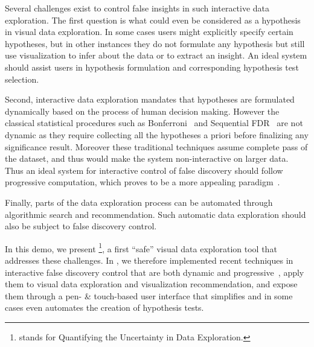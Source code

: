 Several challenges exist to control false insights in such interactive data exploration.  
The first question is what could even be considered as a hypothesis in visual data exploration.
In some cases users might explicitly specify certain hypotheses, but in other instances they do not formulate any hypothesis but still use visualization to infer about the data or to extract an insight.
An ideal system should assist users in hypothesis formulation and corresponding hypothesis test selection.

Second, interactive data exploration mandates that hypotheses are formulated dynamically based on the process of human decision making.  
However the classical statistical procedures such as Bonferroni~\cite{bonferroni1936teoria} and Sequential FDR~\cite{g2016sequential} are not dynamic as they require collecting all the hypotheses a priori before finalizing any significance result.  
Moreover these traditional techniques assume complete pass of the dataset, and thus would make the system non-interactive on larger data.  
Thus an ideal system for interactive control of false discovery should follow progressive computation, which proves to be a more appealing paradigm~\cite{zgraggen2016progressive, onlineagg}.  

Finally, parts of the data exploration process can be automated through algorithmic search and recommendation. Such automatic data exploration should also be subject to false discovery control.  

In this demo, we present \system{}\footnote{\system{} stands for Quantifying the Uncertainty in Data Exploration.}, a first ``safe'' visual data exploration tool that addresses these challenges. 
In \system{}, we therefore implemented recent techniques in interactive false discovery control that are both dynamic and progressive~\cite{zhao2016controlling}, apply them to visual data exploration and visualization recommendation, and expose them through a pen- \& touch-based user interface that simplifies and in some cases even automates the creation of hypothesis tests.



